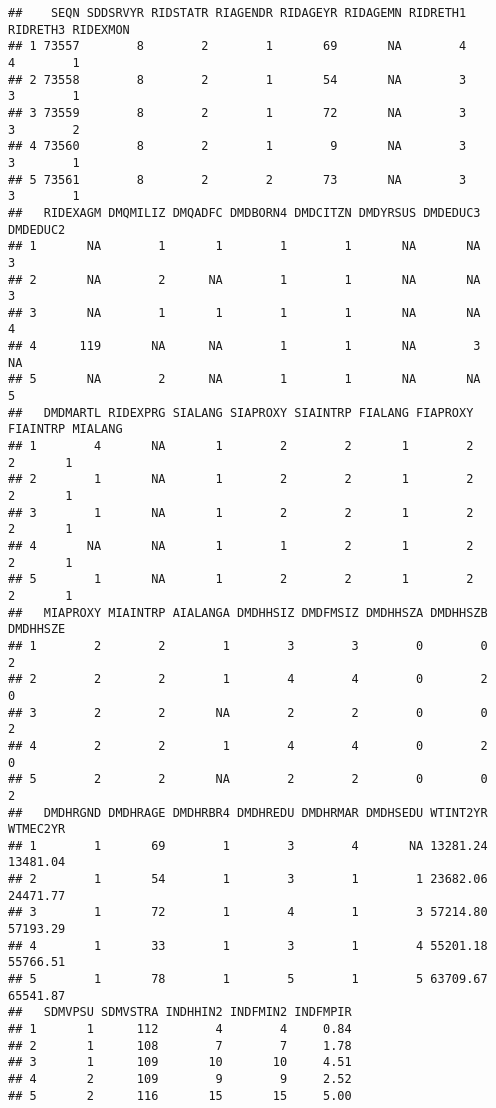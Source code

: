 \documentclass[
]{book}
\begin{document}
\begin{verbatim}
##    SEQN SDDSRVYR RIDSTATR RIAGENDR RIDAGEYR RIDAGEMN RIDRETH1 RIDRETH3 RIDEXMON
## 1 73557        8        2        1       69       NA        4        4        1
## 2 73558        8        2        1       54       NA        3        3        1
## 3 73559        8        2        1       72       NA        3        3        2
## 4 73560        8        2        1        9       NA        3        3        1
## 5 73561        8        2        2       73       NA        3        3        1
##   RIDEXAGM DMQMILIZ DMQADFC DMDBORN4 DMDCITZN DMDYRSUS DMDEDUC3 DMDEDUC2
## 1       NA        1       1        1        1       NA       NA        3
## 2       NA        2      NA        1        1       NA       NA        3
## 3       NA        1       1        1        1       NA       NA        4
## 4      119       NA      NA        1        1       NA        3       NA
## 5       NA        2      NA        1        1       NA       NA        5
##   DMDMARTL RIDEXPRG SIALANG SIAPROXY SIAINTRP FIALANG FIAPROXY FIAINTRP MIALANG
## 1        4       NA       1        2        2       1        2        2       1
## 2        1       NA       1        2        2       1        2        2       1
## 3        1       NA       1        2        2       1        2        2       1
## 4       NA       NA       1        1        2       1        2        2       1
## 5        1       NA       1        2        2       1        2        2       1
##   MIAPROXY MIAINTRP AIALANGA DMDHHSIZ DMDFMSIZ DMDHHSZA DMDHHSZB DMDHHSZE
## 1        2        2        1        3        3        0        0        2
## 2        2        2        1        4        4        0        2        0
## 3        2        2       NA        2        2        0        0        2
## 4        2        2        1        4        4        0        2        0
## 5        2        2       NA        2        2        0        0        2
##   DMDHRGND DMDHRAGE DMDHRBR4 DMDHREDU DMDHRMAR DMDHSEDU WTINT2YR WTMEC2YR
## 1        1       69        1        3        4       NA 13281.24 13481.04
## 2        1       54        1        3        1        1 23682.06 24471.77
## 3        1       72        1        4        1        3 57214.80 57193.29
## 4        1       33        1        3        1        4 55201.18 55766.51
## 5        1       78        1        5        1        5 63709.67 65541.87
##   SDMVPSU SDMVSTRA INDHHIN2 INDFMIN2 INDFMPIR
## 1       1      112        4        4     0.84
## 2       1      108        7        7     1.78
## 3       1      109       10       10     4.51
## 4       2      109        9        9     2.52
## 5       2      116       15       15     5.00
\end{verbatim}
\end{document}
